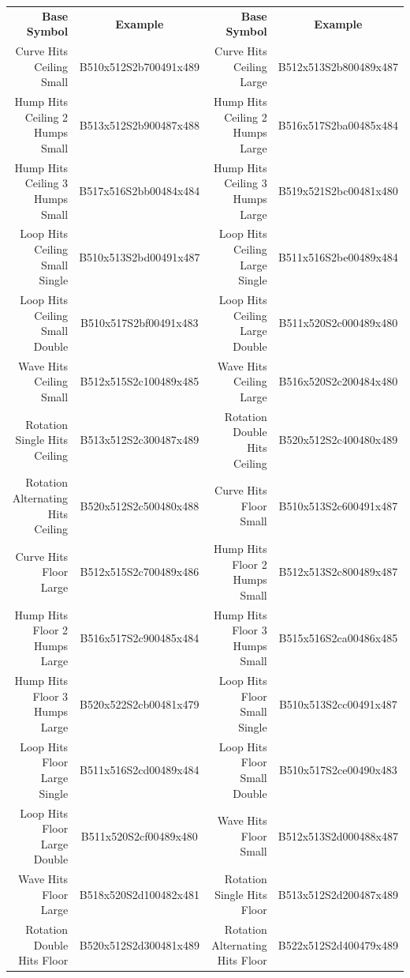 \documentclass{article}
\begin{document}
\begin{center}
\begin{tabular}{rcrc}
\textbf{Base Symbol}&\textbf{Example}&\textbf{Base Symbol}&\textbf{Example}\\
Curve Hits Ceiling Small         &B510x512S2b700491x489&Curve Hits Ceiling Large       &B512x513S2b800489x487\\
Hump Hits Ceiling 2 Humps Small  &B513x512S2b900487x488&Hump Hits Ceiling 2 Humps Large&B516x517S2ba00485x484\\
Hump Hits Ceiling 3 Humps Small  &B517x516S2bb00484x484&Hump Hits Ceiling 3 Humps Large&B519x521S2bc00481x480\\
Loop Hits Ceiling Small Single   &B510x513S2bd00491x487&Loop Hits Ceiling Large Single &B511x516S2be00489x484\\
Loop Hits Ceiling Small Double   &B510x517S2bf00491x483&Loop Hits Ceiling Large Double &B511x520S2c000489x480\\
Wave Hits Ceiling Small          &B512x515S2c100489x485&Wave Hits Ceiling Large        &B516x520S2c200484x480\\
Rotation Single Hits Ceiling     &B513x512S2c300487x489&Rotation Double Hits Ceiling   &B520x512S2c400480x489\\
Rotation Alternating Hits Ceiling&B520x512S2c500480x488&Curve Hits Floor Small         &B510x513S2c600491x487\\
Curve Hits Floor Large           &B512x515S2c700489x486&Hump Hits Floor 2 Humps Small  &B512x513S2c800489x487\\
Hump Hits Floor 2 Humps Large    &B516x517S2c900485x484&Hump Hits Floor 3 Humps Small  &B515x516S2ca00486x485\\
Hump Hits Floor 3 Humps Large    &B520x522S2cb00481x479&Loop Hits Floor Small Single   &B510x513S2cc00491x487\\
Loop Hits Floor Large Single     &B511x516S2cd00489x484&Loop Hits Floor Small Double   &B510x517S2ce00490x483\\
Loop Hits Floor Large Double     &B511x520S2cf00489x480&Wave Hits Floor Small          &B512x513S2d000488x487\\
Wave Hits Floor Large            &B518x520S2d100482x481&Rotation Single Hits Floor     &B513x512S2d200487x489\\
Rotation Double Hits Floor       &B520x512S2d300481x489&Rotation Alternating Hits Floor&B522x512S2d400479x489\\
\end{tabular}
\end{center}
\end{document}
